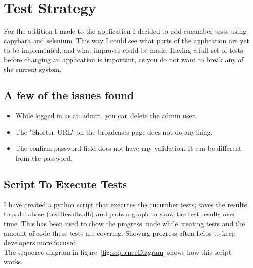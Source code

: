 \documentclass[10pt,a4paper,titlepage]{article}
\begin{document}
\section{Test Strategy}
For the addition I made to the application I decided to add cucumber tests using capybara and selenium. This way I could see what parts of the application are yet to be implemented, and what improves could be made. Having a full set of tests before changing an application is important, as you do not want to break any of the current system. 

 

\subsection{A few of the issues found}
\begin{itemize}
\item While logged in as an admin, you can delete the admin user.
\item The "Shorten URL" on the broadcasts page does not do anything.
\item The confirm password field does not have any validation. It can be different from the password.
\end{itemize}


\subsection{Script To Execute Tests}
I have created a python script that executes the cucumber tests; saves the results to a database (testResults.db) and  plots a graph to show the test results over time. This has been used to show the progress made while creating tests and the amount of code these tests are covering. Showing progress often helps to keep developers more focused.\\

The sequence diagram in figure~\ref{fig:sequenceDiagram} shows how this script works.
\end{document}
